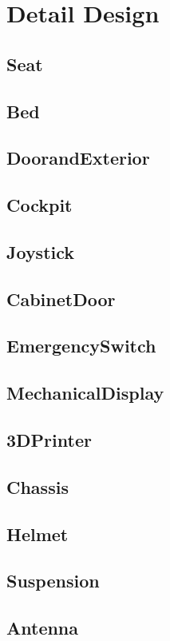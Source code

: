 

\chapter{Detail Design}
\newcommand{\DetailDesign}[1]{
\section{#1}

}

\newcommand{\DetailDesignDrawing}[2]{
\begin{figure}[!ht]
    \centering
    \texttt{[image: \#1]}
    \caption{#2}
\end{figure}
}

\DetailDesign{Seat}
\clearpage
\DetailDesign{Bed}
\clearpage
\DetailDesign{DoorandExterior}
\clearpage
\DetailDesign{Cockpit}
\clearpage
\DetailDesign{Joystick}
\clearpage
\DetailDesign{CabinetDoor}
\clearpage
\DetailDesign{EmergencySwitch}
\clearpage
\DetailDesign{MechanicalDisplay}
\clearpage
\DetailDesign{3DPrinter}
\clearpage
\DetailDesign{Chassis}
\clearpage
\DetailDesign{Helmet}
\clearpage
\DetailDesign{Suspension}
\clearpage
\DetailDesign{Antenna}
